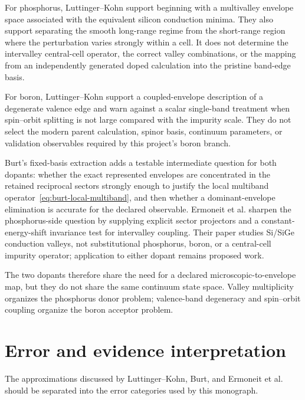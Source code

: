 For phosphorus, Luttinger--Kohn support beginning with a multivalley envelope
space associated with the equivalent silicon conduction minima. They also support
separating the smooth long-range regime from the short-range region where the
perturbation varies strongly within a cell. It does not determine the
intervalley central-cell operator, the correct valley combinations, or the
mapping from an independently generated doped calculation into the pristine
band-edge basis.

For boron, Luttinger--Kohn support a coupled-envelope description of a degenerate
valence edge and warn against a scalar single-band treatment when spin--orbit
splitting is not large compared with the impurity scale. They do not select the
modern parent calculation, spinor basis, continuum parameters, or validation
observables required by this project's boron branch.

Burt's fixed-basis extraction adds a testable intermediate question for both
dopants: whether the exact represented envelopes are concentrated in the
retained reciprocal sectors strongly enough to justify the local multiband
operator~\eqref{eq:burt-local-multiband}, and then whether a dominant-envelope
elimination is accurate for the declared observable. Ermoneit et al. sharpen the
phosphorus-side question by supplying explicit sector projectors and a
constant-energy-shift invariance test for intervalley coupling. Their paper
studies Si/SiGe conduction valleys, not substitutional phosphorus, boron, or a
central-cell impurity operator; application to either dopant remains proposed
work.

The two dopants therefore share the need for a declared microscopic-to-envelope
map, but they do not share the same continuum state space. Valley multiplicity
organizes the phosphorus donor problem; valence-band degeneracy and spin--orbit
coupling organize the boron acceptor problem.

\section{Error and evidence interpretation}

The approximations discussed by Luttinger--Kohn, Burt, and Ermoneit et al.
should be separated into the error categories used by this monograph.

